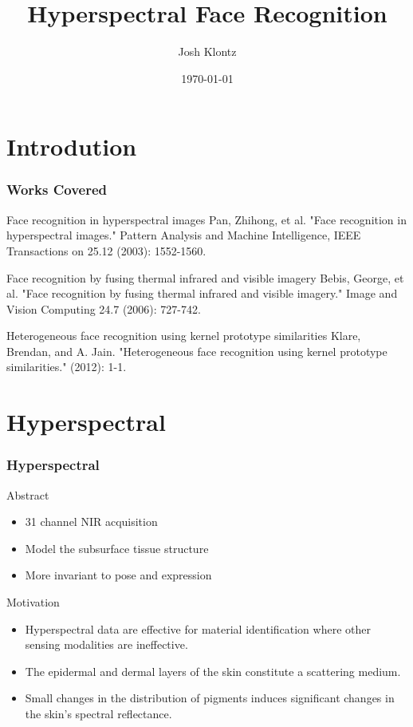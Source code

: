 \documentclass{beamer}
\title[Hyperspectral]{Hyperspectral Face Recognition}
\author{Josh Klontz}
\date{\today}
\begin{document}
\begin{frame}
\titlepage
\end{frame}

\section{Introdution}
\begin{frame}
\frametitle{Works Covered}
\begin{block}{Face recognition in hyperspectral images}
Pan, Zhihong, et al. "Face recognition in hyperspectral images." Pattern Analysis and Machine Intelligence, IEEE Transactions on 25.12 (2003): 1552-1560.
\end{block}
\pause
\begin{block}{Face recognition by fusing thermal infrared and visible imagery}
Bebis, George, et al. "Face recognition by fusing thermal infrared and visible imagery." Image and Vision Computing 24.7 (2006): 727-742.
\end{block}
\pause
\begin{block}{Heterogeneous face recognition using kernel prototype similarities}
Klare, Brendan, and A. Jain. "Heterogeneous face recognition using kernel prototype similarities." (2012): 1-1.
\end{block}
\end{frame}

\section{Hyperspectral}
\begin{frame}
\frametitle{Hyperspectral}
\begin{block}{Abstract}
\begin{itemize}
\item 31 channel NIR acquisition
\item Model the subsurface tissue structure
\item More invariant to pose and expression
\end{itemize}
\end{block}
\pause
\begin{block}{Motivation}
\begin{itemize}
\item Hyperspectral data are effective for material identification where other sensing modalities are ineffective.
\item The epidermal and dermal layers of the skin constitute a scattering medium.
\item Small changes in the distribution of pigments induces significant changes in the skin's spectral reflectance.
\end{itemize}
\end{block}
\end{frame}
\end{document}
